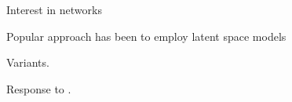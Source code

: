 

Interest in networks

Popular approach has been to employ latent space models

Variants.

Response to \citet{cranmer:etal:2016}.
